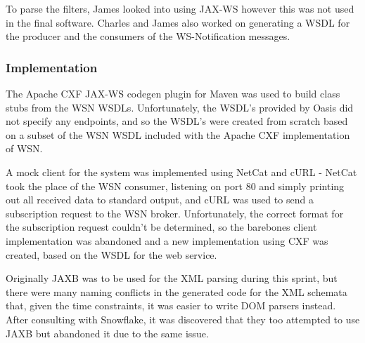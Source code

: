 \documentclass[a4paper, 12pt, twoside]{article}
\begin{document}
To parse the filters, James looked into using JAX-WS however this was not used in the final software. Charles and James also worked on generating a WSDL for the producer and the consumers of the WS-Notification messages.


\subsubsection{Implementation}

The Apache CXF JAX-WS codegen plugin for Maven was used to build class stubs from the WSN WSDLs. Unfortunately, the WSDL's provided by Oasis did not specify any endpoints, and so the WSDL's were created from scratch based on a subset of the WSN WSDL included with the Apache CXF implementation of WSN.

A mock client for the system was implemented using NetCat and cURL - NetCat took the place of the WSN consumer, listening on port 80 and simply printing out all received data to standard output, and cURL was used to send a subscription request to the WSN broker. Unfortunately, the correct format for the subscription request couldn't be determined, so the barebones client implementation was abandoned and a new implementation using CXF was created, based on the WSDL for the web service.

Originally JAXB was to be used for the XML parsing during this sprint, but there were many naming conflicts in the generated code for the XML schemata that, given the time constraints, it was easier to write DOM parsers instead. After consulting with Snowflake, it was discovered that they too attempted to use JAXB but abandoned it due to the same issue.
\end{document}
